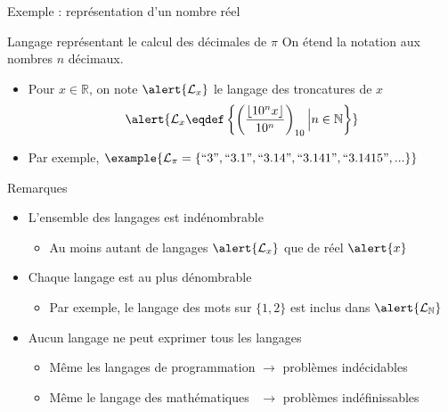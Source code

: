 
\begingroup

\begin{frame}{Exemple : représentation d'un nombre réel}

  \begin{block}{Langage représentant le calcul des décimales de $\pi$}
    On étend la notation  aux nombres $n$ décimaux. 
    \begin{itemize}
    \item Pour $x\in \mathbb{R}$, on note $\alert{\mathcal{L}_{x}}$ le langage des troncatures de $x$
      $$\alert{\mathcal{L}_{x} \eqdef \left\{\left(\frac{\left\lfloor 10^n x \right\rfloor}{10^n} \right)_{10} \Big| n \in \mathbb{N}\right\}}$$
    \item Par exemple, $\example{\mathcal{L}_{\pi} = \left\{\text{``3''}, \text{``3.1''}, \text{``3.14''}, \text{``3.141''}, \text{``3.1415''}, ...   \right\}}$
    \end{itemize}
  \end{block}

  \pause

  \begin{alertblock}{Remarques}
    \begin{itemize}
    \item L'ensemble des langages est indénombrable
      \begin{itemize}
      \item Au moins autant de langages $\alert{\mathcal{L}_{x}}$ que de réel $\alert{x}$
      \end{itemize}
    \item Chaque langage est au plus dénombrable
      \begin{itemize}
      \item Par exemple, le langage des mots sur $\{1, 2\}$ est inclus dans $\alert{\mathcal{L}_{\mathbb{N}}}$
      \end{itemize}
    \item Aucun langage ne peut exprimer tous les langages 
      \begin{itemize}
      \item Même les langages de programmation $\rightarrow$ \alert{problèmes indécidables}
      \item Même le langage des mathématiques ~$\rightarrow$ \alert{problèmes indéfinissables}
      \end{itemize}
    \end{itemize}
  \end{alertblock}

\end{frame}

\endgroup
\endinput
